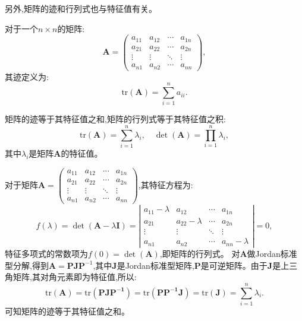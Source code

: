 另外,矩阵的迹和行列式也与特征值有关。
\begin{defn}
    对于一个$n \times n$的矩阵:
    \begin{equation}
        \mathbf{A}=\begin{pmatrix}
            a_{11} & a_{12} & \cdots & a_{1n} \\
            a_{21} & a_{22} & \cdots & a_{2n} \\
            \vdots & \vdots & \ddots & \vdots \\
            a_{n1} & a_{n2} & \cdots & a_{nn}
        \end{pmatrix},
    \end{equation}
    其迹定义为:
    \begin{equation}
        \text{tr}(\mathbf{A}) = \sum_{i=1}^{n} a_{ii}.
    \end{equation}
\end{defn}
\begin{thm}\label{thm:trace_det}
    矩阵的迹等于其特征值之和,矩阵的行列式等于其特征值之积:
    \begin{equation}
        \text{tr}(\mathbf{A}) = \sum_{i=1}^{n} \lambda_i,\quad \det(\mathbf{A}) = \prod_{i=1}^{n} \lambda_i,
    \end{equation}
    其中$\lambda_i$是矩阵$\mathbf{A}$的特征值。
\end{thm}
\begin{pf}
   对于矩阵$\mathbf{A}= \begin{pmatrix}
    a_{11} & a_{12} & \cdots & a_{1n} \\
    a_{21} & a_{22} & \cdots & a_{2n} \\
    \vdots & \vdots & \ddots & \vdots \\
    a_{n1} & a_{n2} & \cdots & a_{nn}
\end{pmatrix}$,其特征方程为:
\begin{equation}\label{eq:char_eq}
    f(\lambda)=\det(\mathbf{A} - \lambda \mathbf{I}) = \left| \begin{array}{cccc}
        a_{11}-\lambda & a_{12} & \cdots & a_{1n} \\
        a_{21} & a_{22}-\lambda & \cdots & a_{2n} \\
        \vdots & \vdots & \ddots & \vdots \\
        a_{n1} & a_{n2} & \cdots & a_{nn}-\lambda
    \end{array} \right| = 0,
\end{equation}
特征多项式的常数项为$f(0)=\det(\mathbf{A})$,即矩阵的行列式。
对$\mathbf{A}$做Jordan标准型分解,得到$\mathbf{A}= \mathbf{P} \mathbf{J} \mathbf{P}^{-1}$,其中$\mathbf{J}$是Jordan标准型矩阵,$\mathbf{P}$是可逆矩阵。由于$\mathbf{J}$是上三角矩阵,其对角元素即为特征值,所以:
\begin{equation}
    \text{tr}(\mathbf{A})=\text{tr}(\mathbf{PJP^{-1}})=\text{tr}(\mathbf{PP^{-1}J})=\text{tr}(\mathbf{J})=\sum_{i=1}^{n} \lambda_i.
\end{equation}
可知矩阵的迹等于其特征值之和。
\end{pf}
